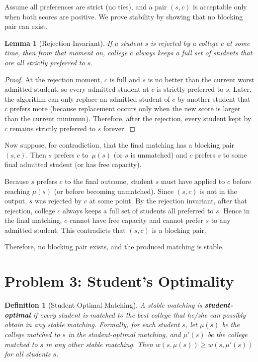 \documentclass[a4paper, UTF-8]{article}
\theoremstyle{plain}
\newtheorem{lemma}[theorem]{\indent Lemma}
\newtheorem{definition}{\indent Definition}[section]
\begin{document}
Assume all preferences are strict (no ties), and a pair $(s,c)$ is acceptable only when both scores are positive. We prove stability by showing that no blocking pair can exist.

\begin{lemma}[Rejection Invariant]
If a student $s$ is rejected by a college $c$ at some time, then from that moment on, college $c$ always keeps a full set of students that are all strictly preferred to $s$.
\end{lemma}

\begin{proof}
At the rejection moment, $c$ is full and $s$ is no better than the current worst admitted student, so every admitted student at $c$ is strictly preferred to $s$. Later, the algorithm can only replace an admitted student of $c$ by another student that $c$ prefers more (because replacement occurs only when the new score is larger than the current minimum). Therefore, after the rejection, every student kept by $c$ remains strictly preferred to $s$ forever.
\end{proof}

Now suppose, for contradiction, that the final matching has a blocking pair $(s,c)$. Then $s$ prefers $c$ to $\,\mu(s)$ (or $s$ is unmatched) and $c$ prefers $s$ to some final admitted student (or has free capacity).

Because $s$ prefers $c$ to the final outcome, student $s$ must have applied to $c$ before reaching $\mu(s)$ (or before becoming unmatched). Since $(s,c)$ is not in the output, $s$ was rejected by $c$ at some point. By the rejection invariant, after that rejection, college $c$ always keeps a full set of students all preferred to $s$. Hence in the final matching, $c$ cannot have free capacity and cannot prefer $s$ to any admitted student. This contradicts that $(s,c)$ is a blocking pair.

Therefore, no blocking pair exists, and the produced matching is stable.

\section{Problem 3: Student's Optimality}

\begin{definition}[Student-Optimal Matching]
    A stable matching is \textbf{student-optimal} if every student is matched to the best college that he/she can possibly obtain in any stable matching. Formally, for each student $s$, let $\mu(s)$ be the college matched to $s$ in the student-optimal matching, and $\mu'(s)$ be the college matched to $s$ in any other stable matching. Then $w(s, \mu(s)) \geq w(s, \mu'(s))$ for all students $s$.
\end{definition}
\end{document}

